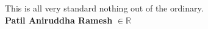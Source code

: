 \documentclass[10pt,a4paper]{article}
\begin{document}
This is all very standard nothing out of the ordinary.\\
\textbf{Patil Aniruddha Ramesh }$ \in \mathbb{R}$
\end{document}
